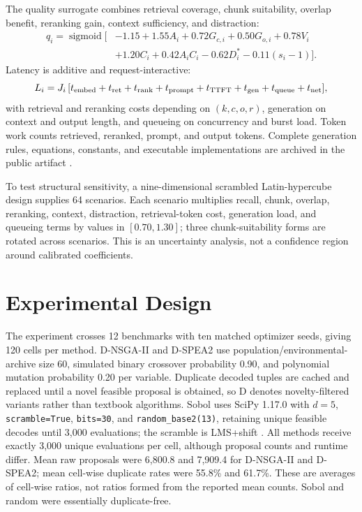 \documentclass[runningheads]{llncs}
\begin{document}
The quality surrogate combines retrieval coverage, chunk suitability, overlap benefit, reranking gain, context sufficiency, and distraction:
\begin{equation}
\begin{aligned}
q_i=\operatorname{sigmoid}\big[&-1.15+1.55A_i+0.72G_{c,i}+0.50G_{o,i}+0.78V_i\\
&+1.20C_i+0.42A_iC_i-0.62D_i^*-0.11(s_i-1)\big].
\end{aligned}
\label{eq:quality}
\end{equation}
Latency is additive and request-interactive:
\begin{equation}
L_i=J_i\,[t_{\rm embed}+t_{\rm ret}+t_{\rm rank}+t_{\rm prompt}+t_{\rm TTFT}+t_{\rm gen}+t_{\rm queue}+t_{\rm net}],
\label{eq:latency}
\end{equation}
with retrieval and reranking costs depending on $(k,c,o,r)$, generation on context and output length, and queueing on concurrency and burst load. Token work counts retrieved, reranked, prompt, and output tokens. Complete generation rules, equations, constants, and executable implementations are archived in the public artifact \cite{artifact}.

To test structural sensitivity, a nine-dimensional scrambled Latin-hypercube design \cite{lhs} supplies 64 scenarios. Each scenario multiplies recall, chunk, overlap, reranking, context, distraction, retrieval-token cost, generation load, and queueing terms by values in $[0.70,1.30]$; three chunk-suitability forms are rotated across scenarios. This is an uncertainty analysis, not a confidence region around calibrated coefficients.

\section{Experimental Design}

The experiment crosses 12 benchmarks with ten matched optimizer seeds, giving 120 cells per method. D-NSGA-II and D-SPEA2 use population/environmental-archive size 60, simulated binary crossover probability 0.90, and polynomial mutation probability 0.20 per variable. Duplicate decoded tuples are cached and replaced until a novel feasible proposal is obtained, so D denotes novelty-filtered variants rather than textbook algorithms. Sobol uses SciPy 1.17.0 with $d=5$, \texttt{scramble=True}, \texttt{bits=30}, and \texttt{random\_base2(13)}, retaining unique feasible decodes until 3,000 evaluations; the scramble is LMS+shift \cite{scipy,sobol}. All methods receive exactly 3,000 unique evaluations per cell, although proposal counts and runtime differ. Mean raw proposals were 6,800.8 and 7,909.4 for D-NSGA-II and D-SPEA2; mean cell-wise duplicate rates were 55.8\% and 61.7\%. These are averages of cell-wise ratios, not ratios formed from the reported mean counts. Sobol and random were essentially duplicate-free.
\end{document}
